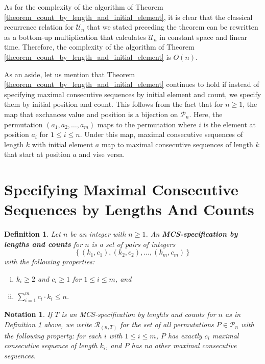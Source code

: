\documentclass{article}
\newtheorem{definition}[theorem]{Definition}
\newtheorem{notation}[theorem]{Notation}
\begin{document}
As for the complexity of the algorithm of Theorem \ref{theorem_count_by_length_and_initial_element},
it is clear that the classical recurrence relation for ${\mathcal U}_n$ that we stated preceding the
theorem can be rewritten as a bottom-up multiplication that calculates ${\mathcal U}_n$ in constant
space and linear time. Therefore, the complexity of the algorithm of
Theorem \ref{theorem_count_by_length_and_initial_element} is $O(n)$.

As an aside, let us mention that Theorem \ref{theorem_count_by_length_and_initial_element} continues
to hold if instead of specifying maximal consecutive sequences by initial element and count, we specify
them by initial position and count. This follows from the fact that for $n\geq 1$,
the map that exchances value and position is a bijection on ${\mathcal P}_n$. Here, the permutation
$(a_1, a_2, \ldots, a_m)$ maps to the permutation where $i$ is the element at position $a_i$ for $1 \leq i\leq n$. 
Under this map, maximal consecutive sequences of length $k$ with initial element $a$ map to maximal
consecutive sequences of length $k$ that start at position $a$ and vise versa.

\section{Specifying Maximal Consecutive Sequences by Lengths And Counts}

\begin{definition} \label{def_mcs_spec_by_length_and_count}
  Let $n$ be an integer with $n\geq 1$. An {\bf MCS-specification by lengths and counts} for $n$ is a
  set of pairs of integers $$\{\,(k_1, c_1), (k_2, c_2), \ldots,(k_m, c_m)\,\}$$ with the following properties:
  \begin{enumerate}[(i)]
  \item
    $k_i \geq 2$ and $c_i \geq 1$ for $1\leq i \leq m$, and
  \item
    $\sum_{i=1}^m c_i \cdot k_i \leq n$.
  \end{enumerate}
\end{definition}

\begin{notation}\label{notation_mcs_spec_by_length_and_count}
  If $T$ is an MCS-specification by lenghts and counts for $n$ as in
  Definition \ref{def_mcs_spec_by_length_and_count}
  above, we write ${\mathcal R}_{(n,T)}$ for the set of all permutations
  $P \in {\mathcal P}_n$ with the following property: for each $i$ with $1\leq i \leq m$, $P$ has exactly $c_i$
  maximal consecutive sequence of length $k_i$, and $P$ has no other maximal
  consecutive sequences.
\end{notation}
\end{document}
